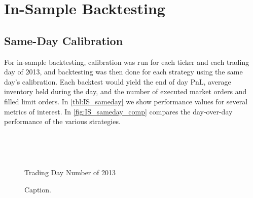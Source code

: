 \FloatBarrier
\section{In-Sample Backtesting}

\subsection{Same-Day Calibration}
For in-sample backtesting, calibration was run for each ticker and each trading day of 2013, and backtesting was then done for each strategy using the same day's calibration. Each backtest would yield the end of day PnL, average inventory held during the day, and the number of executed market orders and filled limit orders. In \autoref{tbl:IS_sameday} we show performance values for several metrics of interest. In \autoref{fig:IS_sameday_comp} compares the day-over-day performance of the various strategies. 

\begin{figure}[htb]
\centering
\begin{subfigure}{.45\linewidth}
  \centering
  \setlength\figureheight{\linewidth} 
  \setlength\figurewidth{\linewidth}
  
\end{subfigure}%
\hfill%
\begin{subfigure}{.45\linewidth}
  \centering
  \setlength\figureheight{\linewidth} 
  \setlength\figurewidth{\linewidth}
   
\end{subfigure}\\
\vspace{1cm}
\begin{subfigure}{.45\linewidth}
  \centering
  \setlength\figureheight{\linewidth} 
  \setlength\figurewidth{\linewidth}
  
\end{subfigure}%
\hfill%
\begin{subfigure}{.45\linewidth}
  \centering
  \setlength\figureheight{\linewidth} 
  \setlength\figurewidth{\linewidth}
   
\end{subfigure}\\

\leavevmode{}\hspace{0pt plus 1filll}\null

Trading Day Number of 2013

\vspace{1cm}
\begin{subfigure}{\linewidth}
  \setlength\figureheight{\linewidth} 
  \setlength\figurewidth{\linewidth}
  \resizebox{\linewidth}{!}{}
\end{subfigure}%
  \caption{Caption.}
  \label{fig:IS_sameday_comp}
\end{figure}

